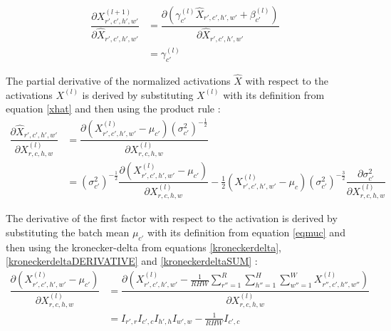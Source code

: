 \documentclass[a4paper, twoside]{article}
\newcommand*{\pd}[2]{\ensuremath{\dfrac{\partial #1}{\partial #2}}}
\begin{document}
\begin{equation}\label{BN_dxdxhat}
\begin{split}
	\pd{X^{(l+1)}_{r',c',h',w'}}{\hat{X}_{r',c',h',w'}}
		& = \pd{(\gamma_{c'}^{(l)} \hat{X}_{r',c',h',w'} + \beta_{c'}^{(l)})}{\hat{X}_{r',c',h',w'}} \\
		& =\gamma_{c'}^{(l)}
\end{split}
\end{equation}

The partial derivative of the normalized activations $\hat{X}$ with respect to the activations $X^{(l)}$ is derived by substituting $X^{(l)}$ with its definition from equation \eqref{xhat} and then using the product rule \cite{webBN1} \cite{webBN2}: 
\begin{equation}\label{BN_kedjeregeln}
\begin{split}
\pd{\hat{X}_{r',c',h',w'}}{{X}^{(l)}_{r,c,h,w}} 
	& = \pd{(X^{(l)}_{r',c',h',w'} - \mu_{c'}){(\sigma^2_{c'})}^{-\frac{1}{2}}}{{X}^{(l)}_{r,c,h,w}} \\
	& = {(\sigma^2_{c'})}^{-\frac{1}{2}} \pd{(X^{(l)}_{r',c',h',w'} - \mu_{c'})}{{X}^{(l)}_{r,c,h,w}} - \frac{1}{2}(X^{(l)}_{r',c',h',w'} - \mu_c){(\sigma^2_{c'})}^{-\frac{3}{2}} \pd{\sigma^2_{c'}}{{X}^{(l)}_{r,c,h,w}}
\end{split}
\end{equation}

The derivative of the first factor with respect to the activation is derived by substituting the batch mean $\mu_{c'}$ with its definition from equation \eqref{eqmuc} and then using the kronecker-delta from equations \eqref{kroneckerdelta}, \eqref{kroneckerdeltaDERIVATIVE} and \eqref{kroneckerdeltaSUM} \cite{webBN1} \cite{webBN2}: 
\begin{equation}\label{mu'}
\begin{split}
\pd{(X^{(l)}_{r',c',h',w'} - \mu_{c'})}{{X}^{(l)}_{r,c,h,w}}
	& = \pd{({X^{(l)}_{r',c',h',w'} - \frac{1}{RHW} \sum\limits^{R }_{r''=1} \sum\limits^{H }_{h''=1} \sum\limits^{W }_{w''=1} X^{(l)}_{r'',c',h'',w''}})}{{X}^{(l)}_{r,c,h,w}} \\
	& = I_{r',r} I_{c',c} I_{h',h} I_{w',w} - \frac{1}{RHW} I_{c',c}
\end{split}
\end{equation}
\end{document}
